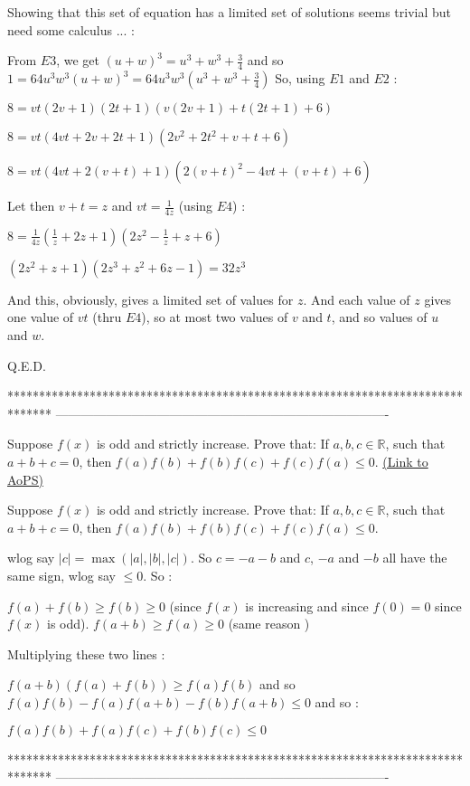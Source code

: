 \begin{solution}
Showing that this set of equation has a limited set of solutions seems trivial but need some calculus ... :

From $ E3$, we get $ (u+w)^3=u^3+w^3+\frac{3}{4}$ and so $ 1=64u^3w^3(u+w)^3=64u^3w^3(u^3+w^3+\frac{3}{4})$
So, using $ E1$ and $ E2$ :

$ 8=vt(2v+1)(2t+1)(v(2v+1)+t(2t+1)+6)$

$ 8=vt(4vt+2v+2t+1)(2v^2+2t^2+v+t+6)$

$ 8=vt(4vt+2(v+t)+1)(2(v+t)^2 -4vt+(v+t)+6)$

Let then $ v+t=z$ and $ vt=\frac{1}{4z}$ (using $ E4$) :

$ 8=\frac{1}{4z}(\frac{1}{z}+2z+1)(2z^2 -\frac{1}{z}+z+6)$

$ (2z^2+z+1)(2z^3+z^2+6z-1)=32z^3$

And this, obviously, gives a limited set of values for $ z$. And each value of $ z$ gives one value of $ vt$ (thru $ E4$), so at most two values of $ v$ and $ t$, and so values of $ u$ and $ w$.

Q.E.D.
\end{solution}
*******************************************************************************
-------------------------------------------------------------------------------

\begin{problem}
	Suppose $ f(x)$ is odd and strictly increase. Prove that:
If $ a,b,c\in \mathbb R$, such that $ a+b+c=0$, then $ f(a)f(b)+f(b)f(c)+f(c)f(a)\le 0$.
	\flushright \href{https://artofproblemsolving.com/community/c6h274550}{(Link to AoPS)}
\end{problem}



\begin{solution}
	\begin{tcolorbox}Suppose $ f(x)$ is odd and strictly increase. Prove that:
If $ a,b,c\in \mathbb R$, such that $ a + b + c = 0$, then $ f(a)f(b) + f(b)f(c) + f(c)f(a)\le 0$.\end{tcolorbox}

wlog say $ |c|=\max(|a|,|b|,|c|)$. So $ c=-a-b$ and $ c$, $ -a$ and $ -b$ all have the same sign, wlog say $ \leq 0$. So :

$ f(a)+f(b)\geq f(b)\geq 0$ (since $ f(x)$ is increasing and since $ f(0)=0$ since $ f(x)$ is odd).
$ f(a+b)\geq f(a)\geq 0$ (same reason )

Multiplying these two lines :

$ f(a+b)(f(a)+f(b)) \geq f(a)f(b)$ and so $ f(a)f(b) -f(a)f(a+b) - f(b)f(a+b) \leq 0$ and so :

$ f(a)f(b) + f(a)f(c) + f(b)f(c) \leq 0$
\end{solution}
*******************************************************************************
-------------------------------------------------------------------------------

